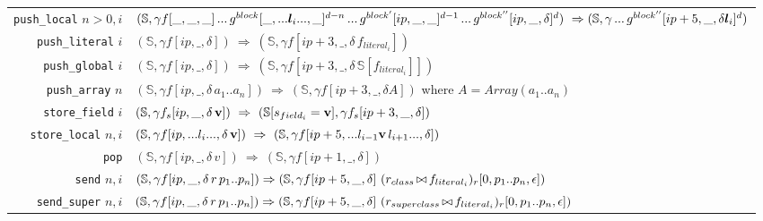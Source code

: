 \documentclass[11pt]{article}
\begin{document}
\begin{table}[tbp]
\begin{center}
\begin{tabular}[t]{|r|l|}
{\tt push\_local} $n > 0, i$ &
\begin{minipage}[t]{.78\linewidth}
$(\mathbb{S},\gamma f[\_,\_,\_] \,...\, g^{block}[\_,... {\bm l_i} ...,\_]^{d-n} \,...\, g^{block'}[ip,\_,\_]^{d-1}\,...\, g^{block''}[ip,\_,\delta]^{d}) ~\Rightarrow\\
(\mathbb{S},\gamma\, ... \,g^{block''}[ip+5,\_,\delta {\bm l_i}]^{d})$
\end{minipage} \\

{\tt push\_literal} $i$ & $(\mathbb{S},\gamma f[ip,\_,\delta]) ~\Rightarrow~ (\mathbb{S},\gamma f[ip+3,\_,\delta \,f_{literal_i}])$ \\

{\tt push\_global} $i$  & $(\mathbb{S},\gamma f[ip,\_,\delta]) ~\Rightarrow~ (\mathbb{S},\gamma f[ip+3,\_,\delta \,\mathbb{S}[f_{literal_i}]])$ \\

{\tt push\_array} $n$  &  $(\mathbb{S},\gamma f[ip,\_,\delta\,a_1..a_n]) ~\Rightarrow~ (\mathbb{S}, \gamma f[ip+3,\_,\delta A])$ where $A = Array(a_1..a_n)$ \\

{\tt store\_field} $i$ & $(\mathbb{S}, \gamma f_s[ip,\_,\delta \,{\bf v}]) ~\Rightarrow~ (\mathbb{S}[s_{field_i} = {\bf v}],\gamma f_s[ip+3,\_,\delta])$ \\

{\tt store\_local} $n,i$ & $(\mathbb{S},\gamma f[ip, ...l_i...,\delta \,{\bf v}]) ~\Rightarrow~ (\mathbb{S},\gamma f[ip+5,...l_{i-1} {\bf v} \,l_{i+1}...,\delta])$ \\

{\tt pop} & $(\mathbb{S},\gamma f[ip,\_,\delta \,v]) ~\Rightarrow~ (\mathbb{S},\gamma f[ip+1,\_,\delta])$\\
\hline

{\tt send} $n,i$ & 
\begin{minipage}[c]{.78\linewidth}
$(\mathbb{S},\gamma f[ip,\_,\delta \,r\, p_1 .. p_{n}]) \Rightarrow 
(\mathbb{S},\gamma f[ip+5,\_,\delta] ~(r_{class}\,{\small \bowtie} \,f_{literal_i})_r[0,p_1 .. p_{n},\epsilon])$
\end{minipage}\\

{\tt send\_super} $n,i$ & 
\begin{minipage}[c]{.78\linewidth}
$(\mathbb{S},\gamma f[ip,\_,\delta \,r\, p_1 .. p_{n}]) \Rightarrow 
(\mathbb{S},\gamma f[ip+5,\_,\delta] ~(r_{superclass}\,{\small \bowtie} \,f_{literal_i})_r[0,p_1 .. p_{n},\epsilon])$
\end{minipage}\\


\end{tabular}
\end{center}
\end{table}
\end{document}
